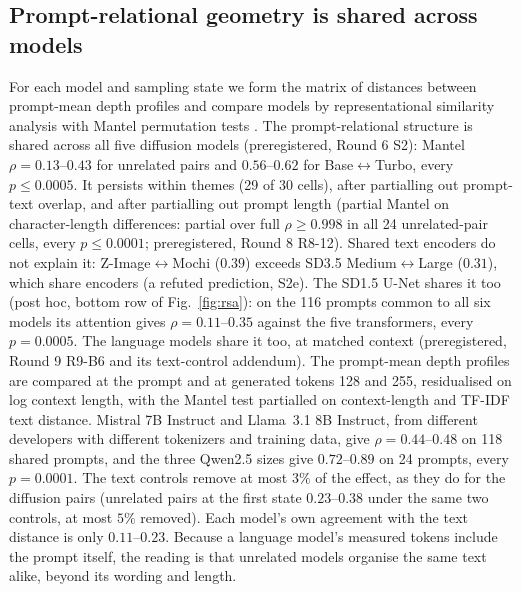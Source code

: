 \documentclass[11pt]{article}
\newcommand{\BT}{Base$\leftrightarrow$Turbo}
\begin{document}
\subsection{Prompt-relational geometry is shared across models}
For each model and sampling state we form the matrix of distances between prompt-mean depth profiles and compare models by representational similarity analysis \citep{kriegeskorte2008representational} with Mantel permutation tests \citep{mantel1967detection}. The prompt-relational structure is shared across all five diffusion models (preregistered, Round 6 S2): Mantel $\rho=0.13$--$0.43$ for unrelated pairs and $0.56$--$0.62$ for \BT{}, every $p\le0.0005$. It persists within themes (29 of 30 cells), after partialling out prompt-text overlap, and after partialling out prompt length (partial Mantel on character-length differences: partial over full $\rho\ge0.998$ in all 24 unrelated-pair cells, every $p\le0.0001$; preregistered, Round 8 R8-12). Shared text encoders do not explain it: Z-Image$\leftrightarrow$Mochi ($0.39$) exceeds SD3.5 Medium$\leftrightarrow$Large ($0.31$), which share encoders (a refuted prediction, S2e). The SD1.5 U-Net shares it too (post hoc, bottom row of Fig.~\ref{fig:rsa}): on the 116 prompts common to all six models its attention gives $\rho=0.11$--$0.35$ against the five transformers, every $p=0.0005$. The language models share it too, at matched context (preregistered, Round 9 R9-B6 and its text-control addendum). The prompt-mean depth profiles are compared at the prompt and at generated tokens 128 and 255, residualised on log context length, with the Mantel test partialled on context-length and TF-IDF text distance. Mistral 7B Instruct and Llama~3.1 8B Instruct, from different developers with different tokenizers and training data, give $\rho=0.44$--$0.48$ on 118 shared prompts, and the three Qwen2.5 sizes give $0.72$--$0.89$ on 24 prompts, every $p=0.0001$. The text controls remove at most $3\%$ of the effect, as they do for the diffusion pairs (unrelated pairs at the first state $0.23$--$0.38$ under the same two controls, at most $5\%$ removed). Each model's own agreement with the text distance is only $0.11$--$0.23$. Because a language model's measured tokens include the prompt itself, the reading is that unrelated models organise the same text alike, beyond its wording and length.
\end{document}
